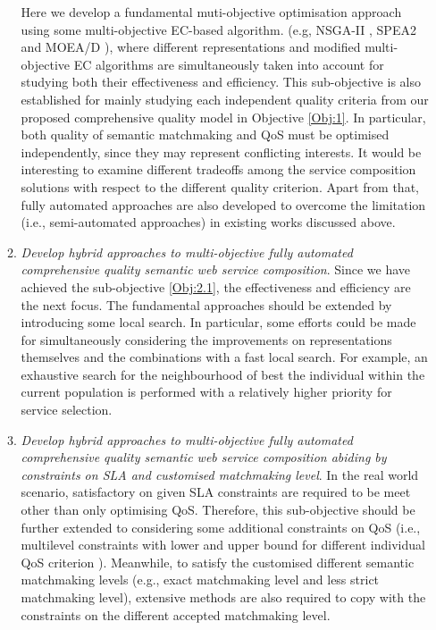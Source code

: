\begin{enumerate}
\begin{enumerate}
    Here we develop a  fundamental muti-objective optimisation approach using some multi-objective EC-based algorithm. (e.g, NSGA-II \cite{deb2002fast}, SPEA2 \cite{zitzler2001spea2} and MOEA/D \cite{zhang2007moea}), where different representations and modified multi-objective EC algorithms are simultaneously taken into account for studying both their effectiveness and efficiency. This sub-objective is also established for mainly studying each independent quality criteria from our proposed comprehensive quality model in Objective \ref{Obj:1}.  In particular, both quality of semantic matchmaking and QoS must be optimised independently, since they may represent conflicting interests. It would be interesting to examine different tradeoffs among the service composition solutions with respect to the different quality criterion. Apart from that,  fully automated approaches are also developed to overcome the limitation (i.e., semi-automated approaches) in existing works discussed above.
   
    \item \emph{Develop hybrid approaches to multi-objective fully automated comprehensive quality semantic web service composition}. Since we have achieved the sub-objective \ref{Obj:2.1},  the effectiveness and efficiency are the next focus. The fundamental approaches should be extended by introducing some local search.  In particular, some efforts could be made for simultaneously considering the improvements on representations themselves and the combinations with a fast local search. For example, an exhaustive search for the neighbourhood of best the individual within the current population is performed with a relatively higher priority for service selection.

    \item \emph{Develop hybrid approaches to multi-objective fully automated comprehensive quality semantic web service composition abiding by constraints on SLA and customised matchmaking level}. In the real world scenario, satisfactory on given SLA constraints are required to be meet other than only optimising QoS. Therefore, this sub-objective should be further extended to considering some additional constraints on  QoS (i.e., multilevel constraints with lower and upper bound for different individual QoS criterion \cite{yin2014hybrid}). Meanwhile, to satisfy the customised different semantic matchmaking levels (e.g., exact matchmaking level and less strict matchmaking level), extensive methods are also required to copy with the constraints on the different accepted matchmaking level.


\end{enumerate}
\end{enumerate}
